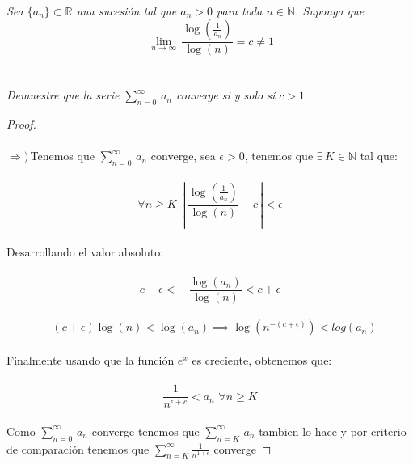 \documentclass[11pt,letterpaper]{article}
\newcommand{\N}{\mathbb{N}}
\begin{document}
\,\\
\begin{tcolorbox}[
	title = \textcolor{black}{\textcolor{white}{Problema}},]
\textit{Sea $\{a_n\}\subset \mathbb{R}$ una sucesi\'on tal que $a_n>0$ para toda $n\in \N$. Suponga que\,\\
\begin{equation*}
\displaystyle\,\lim_{n\rightarrow \infty}\,\frac{\log\left(\frac{1}{a_n}\right)}{\log(n)}=c\neq 1
\end{equation*}\,\\
\,\\
Demuestre que la serie $\sum_{n=0}^{\infty}\,a_n$ converge si y solo s\'i $c>1$
}
\end{tcolorbox}
\begin{proof}\,\\
    \,\\
    $\Rightarrow)$\,Tenemos que $\sum_{n=0}^{\infty}\,a_n$ converge, sea $\epsilon>0$, tenemos que $\exists\,K\in \N$ tal que:\,\\
    \,\\
    \begin{equation*}
    \forall n\geq K\,\,\,\left|\,\frac{\log\left(\frac{1}{a_n}\right)}{\log(n)}-c\,\right|<\epsilon
    \end{equation*}\,\\
    Desarrollando el valor absoluto:\,\\
    \,\\
    \begin{equation*}
        c-\epsilon<-\,\frac{\log(a_n)}{\log(n)}<c+\epsilon
    \end{equation*}\,\\
    \begin{equation*}
        -(c+\epsilon)\log(n)<\log(a_n)\implies \log(n^{-(c+\epsilon)})<log(a_n)
    \end{equation*}\,\\
    Finalmente usando que la funci\'on $e^x$ es creciente, obtenemos que:\,\\
    \,\\
    \begin{equation*}
        \frac{1}{n^{\epsilon+c}}<a_n\,\,\forall n\geq K
    \end{equation*}\,\\
    Como $\sum_{n=0}^{\infty}\,a_n$ converge tenemos que $\sum_{n=K}^\infty\,a_n$ tambien lo hace y por 
    criterio de comparaci\'on tenemos que $\sum_{n=K}^{\infty}\frac{1}{n^{1+\epsilon}}$ converge

\end{proof}
\end{document}
